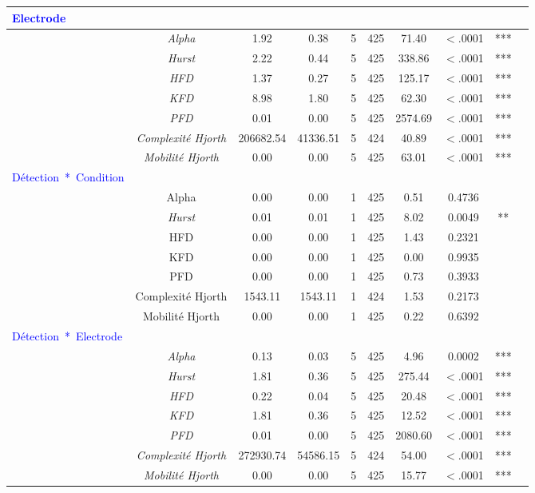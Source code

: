 \begin{table}[!t]
\begin{tabular}{|l|*{9}{c|}}
\hline
\textcolor{blue}{Electrode} & & & & & & & & \\ 
\hline
& \textit{Alpha} & 1.92 & 0.38 & 5 & 425 & 71.40 & $<$.0001 & *** \\ 
& \textit{Hurst} & 2.22 & 0.44 & 5 & 425 & 338.86 & $<$.0001 & *** \\ 
& \textit{HFD} & 1.37 & 0.27 & 5 & 425 & 125.17 & $<$.0001 & *** \\ 
& \textit{KFD} & 8.98 & 1.80 & 5 & 425 & 62.30 & $<$.0001 & *** \\ 
& \textit{PFD} & 0.01 & 0.00 & 5 & 425 & 2574.69 & $<$.0001 & *** \\ 
& \textit{Complexité Hjorth} & 206682.54 & 41336.51 & 5 & 424 & 40.89 & $<$.0001 & *** \\ 
& \textit{Mobilité Hjorth} & 0.00 & 0.00 & 5 & 425 & 63.01 & $<$.0001 & *** \\ 
\hline
\textcolor{blue}{Détection~*~Condition} & & & & & & & & \\ 
\hline
& Alpha & 0.00 & 0.00 & 1 & 425 & 0.51 & 0.4736 & \\ 
& \textit{Hurst} & 0.01 & 0.01 & 1 & 425 & 8.02 & 0.0049 & ** \\ 
& HFD & 0.00 & 0.00 & 1 & 425 & 1.43 & 0.2321 & \\ 
& KFD & 0.00 & 0.00 & 1 & 425 & 0.00 & 0.9935 & \\ 
& PFD & 0.00 & 0.00 & 1 & 425 & 0.73 & 0.3933 & \\ 
& Complexité Hjorth & 1543.11 & 1543.11 & 1 & 424 & 1.53 & 0.2173 & \\ 
& Mobilité Hjorth & 0.00 & 0.00 & 1 & 425 & 0.22 & 0.6392 & \\ 
\hline
\textcolor{blue}{Détection~*~Electrode} & & & & & & & & \\ 
\hline
& \textit{Alpha} & 0.13 & 0.03 & 5 & 425 & 4.96 & 0.0002 & *** \\ 
& \textit{Hurst} & 1.81 & 0.36 & 5 & 425 & 275.44 & $<$.0001 & *** \\ 
& \textit{HFD} & 0.22 & 0.04 & 5 & 425 & 20.48 & $<$.0001 & *** \\ 
& \textit{KFD} & 1.81 & 0.36 & 5 & 425 & 12.52 & $<$.0001 & *** \\ 
& \textit{PFD} & 0.01 & 0.00 & 5 & 425 & 2080.60 & $<$.0001 & *** \\ 
& \textit{Complexité Hjorth} & 272930.74 & 54586.15 & 5 & 424 & 54.00 & $<$.0001 & *** \\ 
& \textit{Mobilité Hjorth} & 0.00 & 0.00 & 5 & 425 & 15.77 & $<$.0001 & *** \\ 

\end{tabular}
\end{table}

